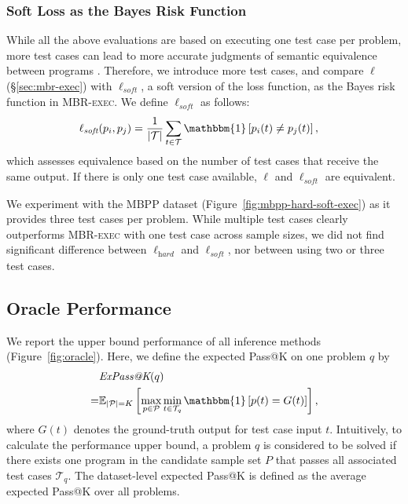 \documentclass[11pt]{article}
\newcommand{\mbrexec}{\textsc{MBR-exec}\xspace}
\begin{document}
\subsubsection{Soft Loss as the Bayes Risk Function}
While all the above evaluations are based on executing one test case per problem, more test cases can lead to more accurate judgments of semantic equivalence between programs \citep{zhong-etal-2020-semantic}. 
Therefore, we introduce more test cases, and compare $\ell$ (\S\ref{sec:mbr-exec}) with $\ell_\textit{soft}$, a soft version of the loss function, as the Bayes risk function in \mbrexec. We define $\ell_\textit{soft}$ as follows:
\begin{align*}
    \ell_\textit{soft} (p_i, p_j) &= \frac{1}{|\mathcal{T}|}\sum_{t \in \mathcal{T}} \mathbbm{1}\left[p_i(t) \neq p_j(t)\right],
\end{align*}
which assesses equivalence based on the number of test cases that receive the same output. If there is only one test case available, $\ell$ and $\ell_\textit{soft}$ are equivalent.

We experiment with the MBPP dataset (Figure~\ref{fig:mbpp-hard-soft-exec}) as it provides three test cases per problem. While multiple test cases clearly outperforms \mbrexec with one test case across sample sizes, we did not find significant difference between $\ell_\textit{hard}$ and $\ell_\textit{soft}$, nor between using two or three test cases.  \subsection{Oracle Performance}
\label{sec:expr-oracle}
We report the upper bound performance of all inference methods (Figure~\ref{fig:oracle}). Here, we define the expected Pass@K on one problem $q$ by 
\begin{align*}
    & \textit{ExPass@K}(q) \\
    = &\mathbb{E}_{|\mathcal{P}| = K} \left[ 
        \max_{p\in \mathcal{P}}
        \min_{t \in \mathcal{T}_q}
        \mathbbm{1}\left[
            p(t) = G(t)
        \right]
    \right],
\end{align*}
where $G(t)$ denotes the ground-truth output for test case input $t$. 
Intuitively, to calculate the performance upper bound, a problem $q$ is considered to be solved if there exists one program in the candidate sample set $P$ that passes all associated test cases $\mathcal{T}_q$. The dataset-level expected Pass@K is defined as the average expected Pass@K over all problems.
\end{document}
